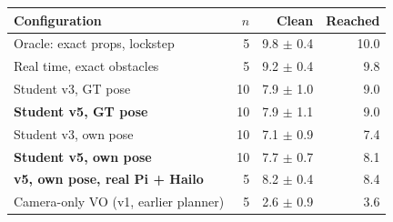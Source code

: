 \begin{tabular}{@{}lrrr@{}}
\toprule
Configuration & $n$ & Clean & Reached \\
\midrule
Oracle: exact props, lockstep & 5 & 9.8 $\pm$ 0.4 & 10.0 \\
Real time, exact obstacles & 5 & 9.2 $\pm$ 0.4 & 9.8 \\
\midrule
Student v3, GT pose & 10 & 7.9 $\pm$ 1.0 & 9.0 \\
\textbf{Student v5, GT pose} & 10 & 7.9 $\pm$ 1.1 & 9.0 \\
\midrule
Student v3, own pose & 10 & 7.1 $\pm$ 0.9 & 7.4 \\
\textbf{Student v5, own pose} & 10 & 7.7 $\pm$ 0.7 & 8.1 \\
\textbf{v5, own pose, real Pi + Hailo} & 5 & 8.2 $\pm$ 0.4 & 8.4 \\
Camera-only VO (v1, earlier planner) & 5 & 2.6 $\pm$ 0.9 & 3.6 \\
\bottomrule
\end{tabular}
